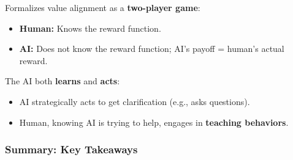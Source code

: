 \begin{defbox}
Formalizes value alignment as a \textbf{two-player game}:
\begin{itemize}
  \item \textbf{Human:} Knows the reward function.
  \item \textbf{AI:} Does not know the reward function; AI's payoff = human's actual reward.
\end{itemize}

The AI both \textbf{learns} and \textbf{acts}:
\begin{itemize}
  \item AI strategically acts to get clarification (e.g., asks questions).
  \item Human, knowing AI is trying to help, engages in \textbf{teaching behaviors}.
\end{itemize}
\end{defbox}

\bigseparator

\subsubsection{Summary: Key Takeaways}

